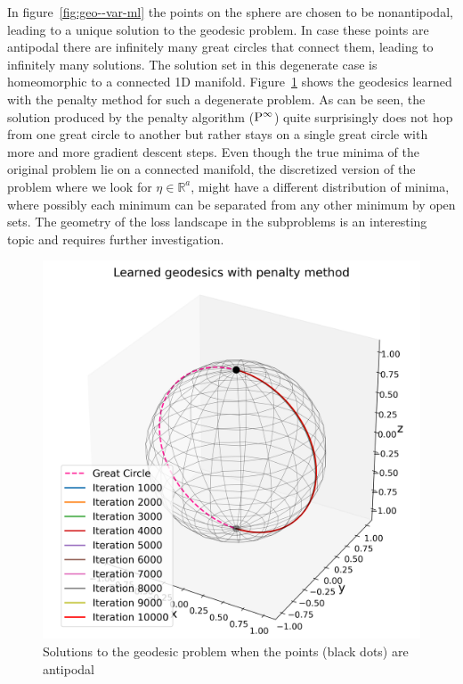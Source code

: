 In figure~\ref{fig:geo--var-ml} the points on the sphere are chosen to be nonantipodal, leading to a unique solution to the geodesic problem. In case these points are antipodal there are infinitely many great circles that connect them, leading to infinitely many solutions. The solution set in this degenerate case is homeomorphic to a connected 1D manifold. Figure~\ref{fig:geo-ap--var-ml} shows the geodesics learned with the penalty method for such a degenerate problem. As can be seen, the solution produced by the penalty algorithm (${\rm P}^\infty$) quite surprisingly does not hop from one great circle to another but rather stays on a single great circle with more and more gradient descent steps. Even though the true minima of the original problem lie on a connected manifold, the discretized version of the problem where we look for $\eta\in\mathbb R^a$, might have a different distribution of minima, where possibly each minimum can be separated from any other minimum by open sets. The geometry of the loss landscape in the subproblems is an interesting topic and requires further investigation.
\begin{figure}[!ht]
    \centering
\includegraphics[scale=0.4]{var-ml/plots/var-plots-sphere-geodesic-antipodal.png}
    \caption{Solutions to the geodesic problem when the points (black dots) are antipodal}
    \label{fig:geo-ap--var-ml}
\end{figure}
